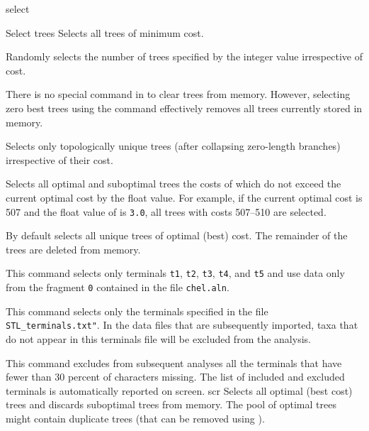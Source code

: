 \begin{command}{select}{}
\begin{arguments}
\begin{argumentgroup}{Select trees}
{Selects all trees of minimum cost.} 
{}

{Randomly selects the number of trees specified by the integer
value irrespective of cost.} 
{}

\begin{statement}
There is no special command in \poy to clear trees from memory. However,
selecting zero best trees using the command 
effectively removes all trees currently stored in memory.
\end{statement}

{Selects only topologically unique trees (after collapsing zero-length
branches) irrespective of their cost.} 
{}

{Selects all optimal and suboptimal trees the costs of which do not exceed
the current optimal cost by the float value. For example, if the current
optimal cost is 507 and the float value of  is
\texttt{3.0}, all trees with costs 507--510 are selected.} 
{}

\end{argumentgroup}

\end{arguments}

{By default \poy selects all unique trees of optimal (best) cost. The remainder
of the trees are deleted from memory.}

\begin{poyexamples}

{This command selects only terminals \texttt{t1}, \texttt{t2},
\texttt{t3}, \texttt{t4}, and \texttt{t5} and use data only from the
fragment \texttt{0} contained in the file \texttt{chel.aln}.}

{This command selects only the terminals specified in the 
file \texttt{STL\_terminals.txt"}.  In the data files that are 
subsequently imported, taxa that do not appear in this 
terminals file will be excluded from the analysis.}

{This command excludes from subsequent analyses all the terminals that
have fewer than 30 percent of characters missing. The list of included and excluded
terminals is automatically reported on screen.}
scr
{Selects all optimal (best cost) trees and discards suboptimal trees from
memory. The pool of optimal trees might contain duplicate trees (that can
be removed using ).}


\end{poyexamples}
\end{command}
